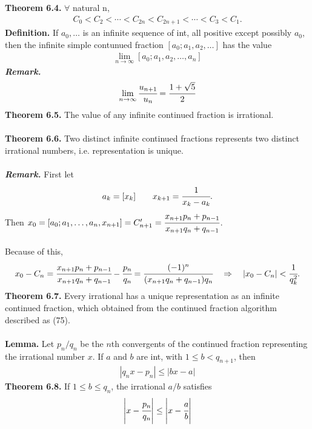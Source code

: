 \documentclass[a4paper,10pt]{article}
\begin{document}
\textbf{Theorem 6.4.} $\forall$ natural n,
\begin{align}
C_{0}<C_{2}<\cdots<C_{2n}<C_{2n+1}<\cdots<C_{3}<C_{1}.
\end{align}
\textbf{Definition.} If $a_{0},\ldots$ is an infinite sequence of int, all positive except possibly $a_{0}$, then the infinite simple contunued fraction $[a_{0};a_{1},a_{2},\ldots]$ has the value
\begin{align}
\lim_{n\rightarrow\infty}[a_{0};a_{1},a_{2},\ldots,a_{n}]
\end{align}
\textit{\textbf{Remark.}} 
\begin{align}
\lim_{n\rightarrow\infty}\cfrac{u_{n+1}}{u_{n}}=\cfrac{1+\sqrt{5}}{2}
\end{align}
\textbf{Theorem 6.5.} The value of any infinite continued fraction is irrational. \\ \\
\textbf{Theorem 6.6.} Two distinct infinite continued fractions represents two distinct irrational numbers, i.e. representation is unique. \\ \\
\textit{\textbf{Remark.}} First let
\begin{align}
a_{k}=[x_{k}] \quad \quad x_{k+1}=\cfrac{1}{x_{k}-a_{k}}.
\end{align}
Then $x_{0}=[a_{0};a_{1},\ldots,a_{n},x_{n+1}]=C'_{n+1}=\cfrac{x_{n+1}p_{n}+p_{n-1}}{x_{n+1}q_{n}+q_{n-1}}$. \\ \\
Because of this,
\begin{align}
x_{0}-C_{n}=\cfrac{x_{n+1}p_{n}+p_{n-1}}{x_{n+1}q_{n}+q_{n-1}}-\cfrac{p_{n}}{q_{n}}=\cfrac{(-1)^{n}}{(x_{n+1}q_{n}+q_{n-1})q_{n}} \quad \Rightarrow \quad |x_{0}-C_{n}|<\cfrac{1}{q_{k}^{2}}.
\end{align}
\textbf{Theorem 6.7.} Every irrational has a unique representation as an infinite continued fraction, which obtained from the continued fraction algorithm described as (75). \\ \\
\textbf{Lemma.} Let $p_{n}/q_{n}$ be the $n$th convergents of the continued fraction representing the irrational number $x$. If $a$ and $b$ are int, with $1\leq b<q_{n+1}$, then
\begin{align}
|q_{n}x-p_{n}|\leq|bx-a|
\end{align}
\textbf{Theorem 6.8.} If $1\leq b\leq q_{n}$, the irrational $a/b$ satisfies
\begin{align}
\left|x-\cfrac{p_{n}}{q_{n}}\right|\leq \left|x-\cfrac{a}{b}\right|
\end{align}
\end{document}
